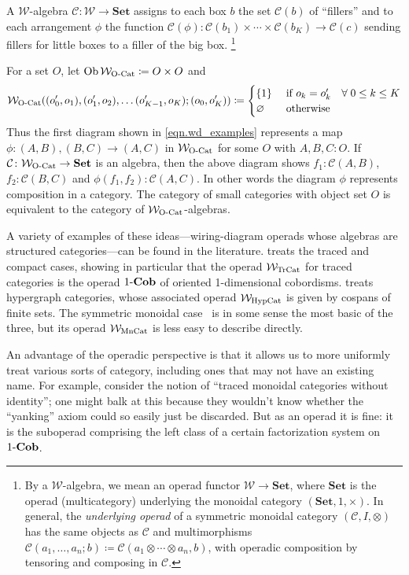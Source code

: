 \documentclass[11pt, oneside, article]{memoir}
\theoremstyle{definition}
\theoremstyle{plain}
\newenvironment{example}
  {\pushQED{\qed}\renewcommand{\qedsymbol}{$\lozenge$}\examplex}
  {\popQED\endexamplex}
\DeclareMathOperator{\ob}{Ob}
\newcommand{\cat}[1]{\mathcal{#1}}%
\newcommand{\Cat}[1]{\mathbf{#1}}%
\newcommand{\tn}[1]{\textnormal{#1}}
\newcommand{\smset}{\Cat{Set}}
\begin{document}
A $\cat{W}$-algebra $\cat{C}\colon\cat{W}\to\smset$ assigns to each box $b$ the set $\cat{C}(b)$ of ``fillers'' and to each arrangement $\phi$ the function $\cat{C}(\phi)\colon \cat{C}(b_1)\times\cdots\times \cat{C}(b_K)\to \cat{C}(c)$ sending fillers for little boxes to a filler of the big box.%
\footnote{
By a $\cat{W}$-algebra, we mean an operad functor $\cat{W}\to\smset$, where $\smset$ is the operad (multicategory) underlying the monoidal category $(\smset,1,\times)$. In general, the \emph{underlying operad} of a symmetric monoidal category $(\cat{C},I,\otimes)$ has the same objects as $\cat{C}$ and multimorphisms $\cat{C}(a_1,\ldots,a_n;b)\coloneqq\cat{C}(a_1\otimes\cdots\otimes a_n,b)$, with operadic composition by tensoring and composing in $\cat{C}$.
}

\begin{example}
For a set $O$, let $\ob\cat{W}_{\tn{O-Cat}}\coloneqq O\times O$ and
\[\cat{W}_{\tn{O-Cat}}((o_0',o_1),(o_1',o_2),\ldots(o_{K-1}',o_K);(o_0,o_K'))\coloneqq
\begin{cases}
\{1\}&\tn{ if }o_k=o_k'\quad \forall\; 0\leq k\leq K\\
\varnothing&\tn{ otherwise}
\end{cases}
\]
Thus the first diagram shown in \eqref{eqn.wd_examples} represents a map $\phi\colon (A,B),(B,C)\to(A,C)$ in $\cat{W}_{\tn{O-Cat}}$ for some $O$ with $A,B,C:O$. If $\cat{C}\colon\cat{W}_{\tn{O-Cat}}\to\smset$ is an algebra, then the above diagram shows $f_1:\cat{C}(A,B)$, $f_2:\cat{C}(B,C)$ and $\phi(f_1,f_2):\cat{C}(A,C)$. In other words the diagram $\phi$ represents composition in a category. The category of small categories with object set $O$ is equivalent to the category of $\cat{W}_{\tn{O-Cat}}$-algebras.
\end{example}

A variety of examples of these ideas---wiring-diagram operads whose algebras are structured categories---can be found in the literature. \cite{Spivak.Schultz.Rupel:2016a} treats the traced and compact cases, showing in particular that the operad $\cat{W}_{\tn{TrCat}}$ for traced categories is the operad $1\tn{-}\Cat{Cob}$ of oriented 1-dimensional cobordisms. \cite{fong2019hypergraph} treats hypergraph categories, whose associated operad $\cat{W}_{\tn{HypCat}}$ is given by cospans of finite sets. The symmetric monoidal case~\cite{patterson2021wiring} is in some sense the most basic of the three, but its operad $\cat{W}_{\tn{MnCat}}$ is less easy to describe directly.

An advantage of the operadic perspective is that it allows us to more uniformly treat various sorts of category, including ones that may not have an existing name. For example, 
consider the notion of ``traced monoidal categories without identity''; one might balk at this because they wouldn't know whether the ``yanking'' axiom could so easily just be discarded. But as an operad it is fine: it is the suboperad comprising the left class of a certain factorization system on $1\tn{-}\Cat{Cob}$.
\end{document}
